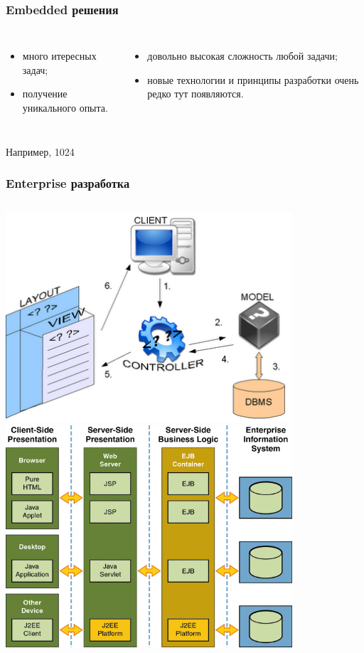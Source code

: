 \documentclass[10pt,pdf,hyperref={unicode}]{beamer}
\begin{document}
\begin{frame}
\frametitle{ Embedded решения }
\begin{columns}

		\begin{itemize}
			\item много итересных задач;
			\item получение уникального опыта.
		\end{itemize}

		\begin{itemize}
			\item довольно высокая сложность любой задачи;
			\item новые технологии и принципы разработки очень редко тут появляются.
		\end{itemize}

\end{columns}

Например, 1024   

\end{frame}


\begin{frame}
\frametitle{Enterprise разработка}

\begin{columns}
		\includegraphics[width=0.8\textwidth]{./ruby.png}
		\includegraphics[width=0.8\textwidth]{./enterprise.png}
\end{columns}

\end{frame}
\end{document}
